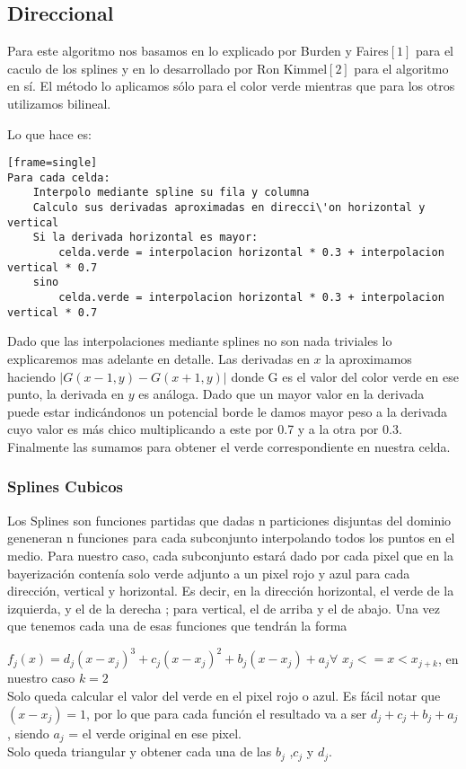 \subsection{Direccional}

Para este algoritmo nos basamos en lo explicado por Burden y Faires$[1]$ para el caculo de los splines y en lo desarrollado por Ron Kimmel$[2]$ para el algoritmo en sí. El método lo aplicamos sólo para el color verde mientras que para los otros utilizamos bilineal. 

Lo que hace es:
\begin{verbatim}[frame=single] 
Para cada celda:
	Interpolo mediante spline su fila y columna
	Calculo sus derivadas aproximadas en direcci\'on horizontal y vertical
	Si la derivada horizontal es mayor:
		celda.verde = interpolacion horizontal * 0.3 + interpolacion vertical * 0.7
	sino
		celda.verde = interpolacion horizontal * 0.3 + interpolacion vertical * 0.7
\end{verbatim}

Dado que las interpolaciones mediante splines no son nada triviales lo explicaremos mas adelante en detalle. Las derivadas en $x$  la aproximamos haciendo $|G(x-1,y)-G(x+1,y)|$ donde G es el valor del color verde en ese punto, la derivada en $y$ es análoga. Dado que un mayor valor en la derivada puede estar indicándonos un potencial borde le damos mayor peso a la derivada cuyo valor es más chico multiplicando a este por 0.7 y a la otra por 0.3. Finalmente las sumamos para obtener el verde correspondiente en nuestra celda.

\subsubsection{Splines Cubicos}
Los Splines son funciones partidas que dadas n particiones disjuntas del dominio geneneran n funciones para cada subconjunto interpolando todos los puntos en el medio. Para nuestro caso, cada subconjunto estará dado por cada pixel que en la bayerización contenía solo verde adjunto a un pixel rojo y azul para cada dirección, vertical y horizontal. Es decir, en la dirección horizontal, el verde de la izquierda, y el de la derecha ; para vertical, el de arriba y el de abajo. 
Una vez que tenemos cada una de esas funciones que tendrán la forma

$f_j(x) = d_j(x-x_j)^3 + c_j(x-x_j)^2 + b_j(x-x_j) + a_j \forall$ $x_j <= x < x_{j+k}$, en nuestro caso $k = 2$ \\

Solo queda calcular el valor del verde en el pixel rojo o azul.
Es fácil notar que $(x-x_j) = 1$, por lo que para cada función el resultado va a ser $d_j+c_j+b_j+a_j$, siendo $a_j$ = el verde original en ese pixel.\\
Solo queda triangular y obtener cada una de las $b_j$ ,$c_j$ y $d_j$.


